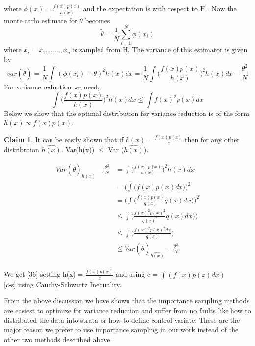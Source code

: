 \documentclass[a4paper,twoside]{iiththesis}
\theoremstyle{definition}
\theoremstyle{definition}
\newtheorem{claim}{Claim}[section]
\theoremstyle{remark}
\begin{document}
where $\phi(x) = \frac{f(x) p(x)} {h(x)}$ and the expectation is with respect to H . Now the monte carlo estimate for $\theta$ becomes 
\begin{equation}
\widetilde{\theta} = \frac{1}{N} \sum_{i=1}^N \phi(x_i) 
\end{equation}
where $x_i = x_1, ......, x_n$ is sampled from H. The variance of this estimator is given by 
\begin{equation}\label{Variance Importance Sampling}
var(\widetilde{\theta}) = \frac{1}{N} \int (\phi(x_i) - \theta)^2 h(x) dx = 
\frac{1}{N}\int  \Big(\frac{f(x)p(x)}{h(x)}\Big)^2  h(x) dx  -\frac{\theta^2}{N}
\end{equation}
For variance reduction we need, 
\begin{equation}
\int  \Big(\frac{f(x)p(x)}{h(x)}\Big)^2  h(x) dx  \leq \int f(x)^2 p(x) dx 
\end{equation}
Below we show that the optimal distribution for variance reduction is of the form $h(x) \propto f(x) p(x)$. \\
\begin{claim}
It can be easily shown that if $h(x) = \frac{f(x) p(x)} {c}$ then for any other distribution 
$\hat{h(x)}$. Var(h(x)) $\leq$ Var ($\hat{h(x)}$).
\end{claim}
\begin{align}
Var(\widetilde{\theta})_{h(x)} - \frac{\theta^2} {N} &= \int  \Big(\frac{f(x)p(x)}{h(x)}\Big)^2  h(x) dx \\
&= \bigg(\int \Big(f(x)p(x) dx \Big)   \bigg)^2 \label{36} \\ 
&= \bigg(\int \Big(\frac{f(x)p(x)}{q(x)}q(x) dx \Big)\bigg )^2 \\
&\leq \int \Big(\frac{f(x)^2p(x)^2}{q(x)^2}q(x) dx )\Big)  \label{c-s} \\ 
&\leq \int \Big(\frac{f(x)^2p(x)^2 dx}{q(x)} \Big) \\
&\leq Var(\widetilde{\theta})_{\hat{h(x)}} - \frac{\theta^2} {N}
\end{align}
\\
We get \ref{36} setting h(x) = $\frac{f(x)p(x)} {c}$ and using c = $\int (f(x)p(x) dx)$ \\
\ref{c-s} using Cauchy-Schwartz Inequality.

From the above discussion we have shown that the importance sampling methods are easiest to optimize for variance reduction and suffer from no faults like how to distributed the data into strata or how to define control variate.
These are the major reason we prefer to use importance sampling in our work instead of the other two methods described above.
\end{document}

